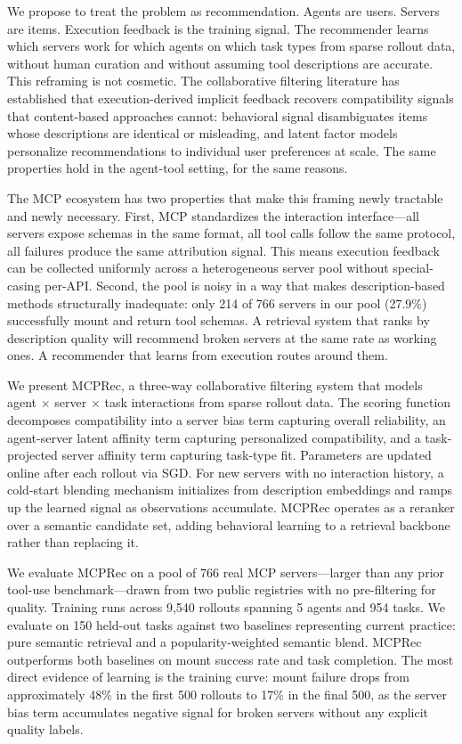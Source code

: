\documentclass{article} %
\begin{document}
We propose to treat the problem as recommendation. Agents are users. Servers are items. Execution feedback is the training signal. The recommender learns which servers work for which agents on which task types from sparse rollout data, without human curation and without assuming tool descriptions are accurate. This reframing is not cosmetic. The collaborative filtering literature has established that execution-derived implicit feedback recovers compatibility signals that content-based approaches cannot: behavioral signal disambiguates items whose descriptions are identical or misleading, and latent factor models personalize recommendations to individual user preferences at scale. The same properties hold in the agent-tool setting, for the same reasons.

The MCP ecosystem has two properties that make this framing newly tractable and newly necessary. First, MCP standardizes the interaction interface---all servers expose schemas in the same format, all tool calls follow the same protocol, all failures produce the same attribution signal. This means execution feedback can be collected uniformly across a heterogeneous server pool without special-casing per-API. Second, the pool is noisy in a way that makes description-based methods structurally inadequate: only 214 of 766 servers in our pool (27.9\%) successfully mount and return tool schemas. A retrieval system that ranks by description quality will recommend broken servers at the same rate as working ones. A recommender that learns from execution routes around them.

We present MCPRec, a three-way collaborative filtering system that models agent $\times$ server $\times$ task interactions from sparse rollout data. The scoring function decomposes compatibility into a server bias term capturing overall reliability, an agent-server latent affinity term capturing personalized compatibility, and a task-projected server affinity term capturing task-type fit. Parameters are updated online after each rollout via SGD. For new servers with no interaction history, a cold-start blending mechanism initializes from description embeddings and ramps up the learned signal as observations accumulate. MCPRec operates as a reranker over a semantic candidate set, adding behavioral learning to a retrieval backbone rather than replacing it.

We evaluate MCPRec on a pool of 766 real MCP servers---larger than any prior tool-use benchmark---drawn from two public registries with no pre-filtering for quality. Training runs across 9{,}540 rollouts spanning 5 agents and 954 tasks. We evaluate on 150 held-out tasks against two baselines representing current practice: pure semantic retrieval and a popularity-weighted semantic blend. MCPRec outperforms both baselines on mount success rate and task completion. The most direct evidence of learning is the training curve: mount failure drops from approximately 48\% in the first 500 rollouts to 17\% in the final 500, as the server bias term accumulates negative signal for broken servers without any explicit quality labels.
\end{document}
